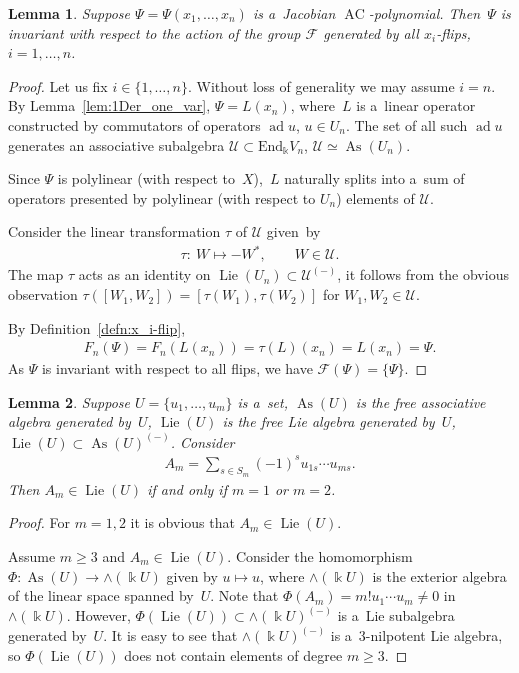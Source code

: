 \documentclass[11pt]{article}
\newtheorem{lemma}{Lemma}
\DeclareMathOperator{\ad}{ad}
\begin{document}
\begin{lemma}
\label{lem:JacobianInvariant}
Suppose $\Psi=\Psi(x_1,\dots, x_n)$ is a~Jacobian $\operatorname{AC}$-polynomial.
Then~$\Psi $ is invariant with respect to the action of the group $\mathcal F$ generated by all $x_i$-flips, $i=1,\dots,
n$.
\end{lemma}

\begin{proof}
Let us f\/ix $i\in \{1,\dots, n\}$.
Without loss of generality we may assume $i=n$.
By Lemma~\ref{lem:1Der_one_var}, $\Psi = L(x_n)$, where~$L$ is a~linear operator constructed by commutators of operators
$\ad u$, $u\in U_n$.
The set of all such $\ad u$ generates an associative subalgebra $\mathcal U\subset \mathrm{End}_\Bbbk V_n$,
$\mathcal U\simeq \operatorname{As}(U_n)$.

Since $\Psi $ is polylinear (with respect to~$X$),~$L$ naturally splits into a~sum of operators presented by polylinear
(with respect to $U_n$) elements of $\mathcal U$.

Consider the linear transformation $\tau $ of $\mathcal U$ given~by
\begin{gather*}
\tau: \ W \mapsto -W^*,
\qquad
W\in \mathcal U.
\end{gather*}
The map $\tau $ acts as an identity on $\operatorname{Lie}(U_n)\subset \mathcal U^{(-)}$, it follows from the obvious observation $\tau
([W_1,W_2])=[\tau(W_1),\tau(W_2)]$ for $W_1,W_2\in \mathcal U$.

By Def\/inition~\ref{defn:x_i-flip},
\begin{gather*}
F_n(\Psi) = F_n(L(x_n)) = \tau(L)(x_n) = L(x_n) = \Psi.
\end{gather*}
As $\Psi $ is invariant with respect to all f\/lips, we have $\mathcal F(\Psi) =\{\Psi \}$.
\end{proof}

\begin{lemma}
\label{lem:AlternatingSum=Lie}
Suppose $U=\{u_1,\dots, u_m\}$ is a~set, $\operatorname{As}(U) $ is the free associative algebra generated by~$U$, $\operatorname{Lie}(U)$ is the free
Lie algebra generated by~$U$, $\operatorname{Lie}(U)\subset \operatorname{As}(U)^{(-)}$.
Consider
\begin{gather*}
A_m = \sum\limits_{s\in S_m}(-1)^s u_{1s}\cdots u_{ms}.
\end{gather*}
Then $A_m \in \operatorname{Lie}(U)$ if and only if $m=1$ or $m=2$.
\end{lemma}

\begin{proof}
For $m=1,2$ it is obvious that $A_m\in \operatorname{Lie}(U)$.

Assume $m\ge 3$ and $A_m\in \operatorname{Lie}(U)$.
Consider the homomorphism $\Phi: \operatorname{As}(U)\to \wedge (\Bbbk U)$ given by $u\mapsto u$, where $\wedge (\Bbbk U)$ is the
exterior algebra of the linear space spanned by~$U$.
Note that $\Phi(A_m) = m! u_1\cdots u_m \ne 0$ in $\wedge(\Bbbk U)$.
However, $\Phi(\operatorname{Lie}(U))\subset \wedge(\Bbbk U)^{(-)}$ is a~Lie subalgebra generated by~$U$.
It is easy to see that $\wedge(\Bbbk U)^{(-)}$ is a~3-nilpotent Lie algebra, so $\Phi(\operatorname{Lie}(U))$ does not contain elements
of degree $m\ge 3$.
\end{proof}
\end{document}
